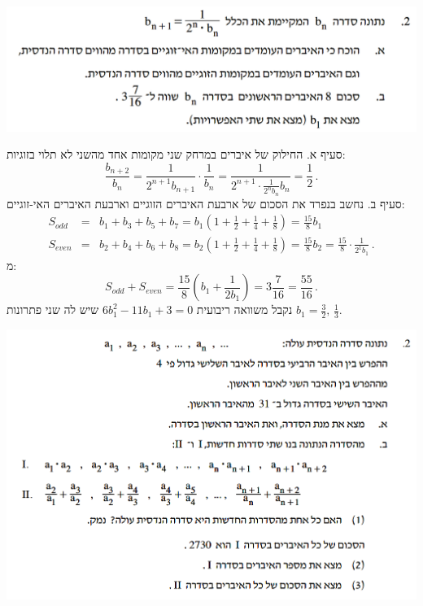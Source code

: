 \documentclass[12pt,a4paper]{article}
\begin{document}
\textbf{}

\begin{center}
\includegraphics[width=.95\textwidth]{summer-2015b-2}
\end{center}
\vspace{-2ex}
סעיף א. החילוק של איברים במרחק שני מקומות אחד מהשני לא תלוי בזוגיות:
\[
\frac{b_{n+2}}{b_n} = \frac{1}{2^{n+1}b_{n+1}}\cdot\frac{1}{b_n}=\frac{1}{2^{n+1}\cdot\displaystyle\frac{1}{2^nb_n}{b_n}}= \frac{1}{2}\,.
\]
סעיף ב. נחשב בנפרד את הסכום של ארבעת האיברים הזוגיים וארבעת האיברים האי-זוגיים:
\begin{eqnarray*}
S_{\mathit{odd}} &=& b_1+b_3+b_5+b_7=b_1\left(1 + \frac{1}{2} + \frac{1}{4} +\frac{1}{8}\right)=\frac{15}{8}b_1\\
S_{\mathit{even}} &=& b_2+b_4+b_6+b_8=b_2\left(1 + \frac{1}{2} + \frac{1}{4} +\frac{1}{8}\right)=\frac{15}{8}b_2=\frac{15}{8}\cdot\frac{1}{2^1b_1}\,.
\end{eqnarray*}
מ:
\[
S_{\mathit{odd}} + S_{\mathit{even}} =\frac{15}{8}\left(b_1+\frac{1}{2b_1}\right)= 3\frac{7}{16}=\frac{55}{16}\,.
\]
נקבל משוואה ריבועית 
$6b_1^2-11b_1+3=0$
שיש לה שני פתרונות 
$b_1=\frac{3}{2},\,\frac{1}{3}$.


\newpage

\textbf{}

\begin{center}
\includegraphics[width=.95\textwidth]{winter-2016-2}
\end{center}
\end{document}
